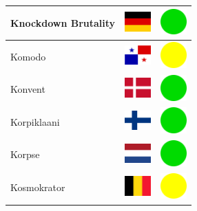 \documentclass[12pt, a4paper, twoside]{report}
\begin{document}
\begin{center}
\begin{longtable}{|p{5cm}|p{2cm}|p{2cm}|}
 Knockdown Brutality                                        & \includegraphics[width=1cm]{../img/flags/de} &   \includegraphics[width=1cm]{../likes/y} \\ \hline
 Komodo                                                     & \includegraphics[width=1cm]{../img/flags/pa} &   \includegraphics[width=1cm]{../likes/m} \\ \hline
 Konvent                                                    & \includegraphics[width=1cm]{../img/flags/dk} &   \includegraphics[width=1cm]{../likes/y} \\ \hline
 Korpiklaani                                                & \includegraphics[width=1cm]{../img/flags/fi} &   \includegraphics[width=1cm]{../likes/y} \\ \hline
 Korpse                                                     & \includegraphics[width=1cm]{../img/flags/nl} &   \includegraphics[width=1cm]{../likes/y} \\ \hline
 Kosmokrator                                                & \includegraphics[width=1cm]{../img/flags/be} &   \includegraphics[width=1cm]{../likes/m} \\ \hline

\end{longtable}
\end{center}
\end{document}
